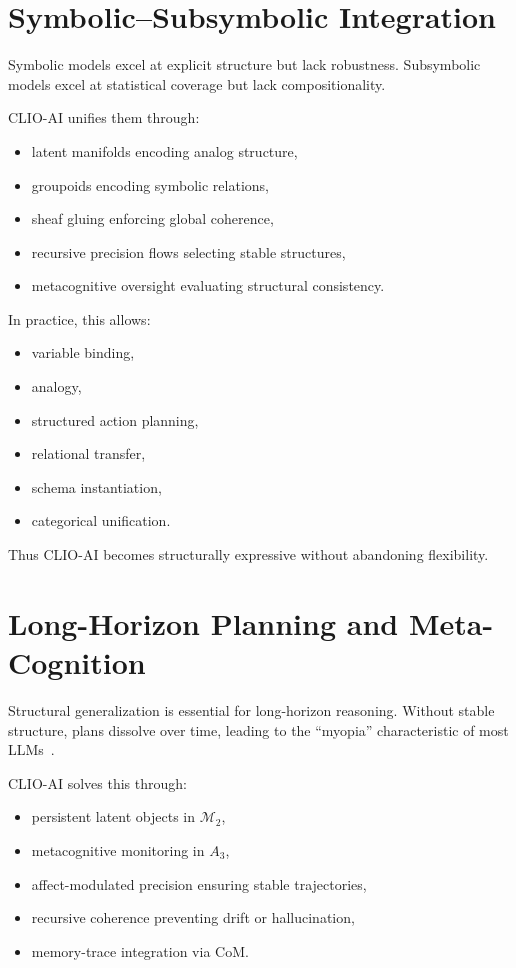 \documentclass[12pt,oneside]{book}
\theoremstyle{plain}
\theoremstyle{definition}
\let\citep\parencite
\begin{document}
\section{Symbolic--Subsymbolic Integration}

Symbolic models excel at explicit structure but lack robustness.
Subsymbolic models excel at statistical coverage but lack compositionality.

CLIO-AI unifies them through:

\begin{itemize}
    \item latent manifolds encoding analog structure,
    \item groupoids encoding symbolic relations,
    \item sheaf gluing enforcing global coherence,
    \item recursive precision flows selecting stable structures,
    \item metacognitive oversight evaluating structural consistency.
\end{itemize}

In practice, this allows:

\begin{itemize}
    \item variable binding,
    \item analogy,
    \item structured action planning,
    \item relational transfer,
    \item schema instantiation,
    \item categorical unification.
\end{itemize}

Thus CLIO-AI becomes structurally expressive without abandoning flexibility.

\section{Long-Horizon Planning and Meta-Cognition}

Structural generalization is essential for long-horizon reasoning.
Without stable structure, plans dissolve over time,
leading to the ``myopia'' characteristic of most LLMs~\citep{cheng2025cognitive}.

CLIO-AI solves this through:

\begin{itemize}
    \item persistent latent objects in $\mathcal{M}_2$,
    \item metacognitive monitoring in $A_3$,
    \item affect-modulated precision ensuring stable trajectories,
    \item recursive coherence preventing drift or hallucination,
    \item memory-trace integration via CoM.
\end{itemize}
\end{document}

